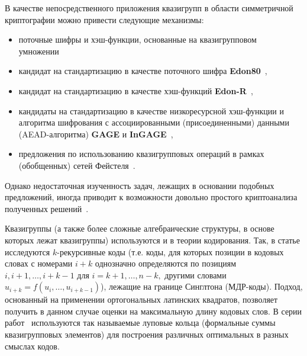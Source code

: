     В качестве непосредственного приложения квазигрупп в области симметричной криптографии можно привести следующие механизмы:
    \begin{itemize}
        \item поточные шифры и хэш-функции, основанные на квазигрупповом умножении~\cite{markovski1999quasigroup, markovski2003quasigroup, markovski2017quasigroup, snavsel2009hash}
        \item кандидат на стандартизацию в качестве поточного шифра \textbf{Edon80}~\cite{edon80},
        \item кандидат на стандартизацию в качестве хэш-функций \textbf{Edon-R}~\cite{EdonR, EdonRprime},
        \item кандидаты на стандартизацию в качестве низкоресурсной хэш-функции и алгоритма шифрования с ассоциированными (присоединенными) данными (AEAD-алгоритма) \textbf{GAGE} и \textbf{InGAGE}~\cite{otte2019gage, gligoroski2019s},
        \item предложения по использованию квазигрупповых операций в рамках (обобщенных) сетей Фейстеля~\cite{tecseleanu2021quasigroups, tecseleanu2022security, tecseleanu2023cryptographic, cherednik17, cherednik19, cherednik20}.
    \end{itemize}
    Однако недостаточная изученность задач, лежащих в основании подобных предложений, иногда приводит к возможности довольно простого криптоанализа полученных решений~\cite{vojvoda2004cryptanalysis, slaminkova2010cryptanalysis, hell2007key, vojvoda2007note}.

    Квазигруппы (а также более сложные алгебраические структуры, в основе которых лежат квазигруппы) используются и в теории кодирования.
    Так, в статье \cite{nechaev98} исследуются $k$-рекурсивные коды (т.е. коды, для которых позиции в кодовых словах с номерами $i+k$ однозначно определяются по позициям $i, i+1, \ldots, i+k-1$ для $i = k+1, \ldots, n-k,$ другими словами $u_{i+k} = f(u_i, \ldots, u_{i+k-1})$), лежащие на границе Синглтона (МДР-коды).
    Подход, основанный на применении ортогональных латинских квадратов, позволяет получить в данном случае оценки на максимальную длину кодовых слов.
    В серии работ~\cite{nechaev04, couselo2004loop, markov12, markov2020nonassociative} используются так называемые луповые кольца (формальные суммы квазигрупповых элементов) для построения различных оптимальных в разных смыслах кодов.

